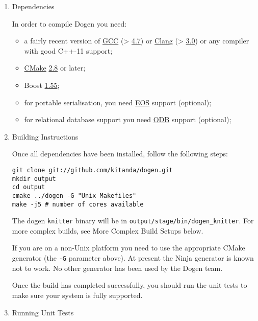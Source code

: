 \documentclass[11pt]{article}
\begin{document}
\begin{enumerate}
\item Dependencies
\label{sec-3-1-2-1}

In order to compile Dogen you need:

\begin{itemize}
\item a fairly recent version of \href{http://gcc.gnu.org/}{GCC} (> \href{http://gcc.gnu.org/gcc-4.7/}{4.7}) or \href{http://clang.llvm.org/index.html}{Clang} (> \href{http://llvm.org/releases/3.0/docs/ClangReleaseNotes.html}{3.0}) or any
compiler with good C++-11 support;
\item \href{http://www.cmake.org/}{CMake} \href{http://www.kitware.com/news/home/browse/CMake?2013_05_22&CMake\%2B2.8.11\%2BNow\%2BAvailable}{2.8} or later;
\item Boost \href{http://www.boost.org/users/history/version_1_55_0.html}{1.55};
\item for portable serialisation, you need \href{http://epa.codeplex.com/}{EOS} support (optional);
\item for relational database support you need \href{http://www.codesynthesis.com/products/odb/}{ODB} support (optional);
\end{itemize}

\item Building Instructions
\label{sec-3-1-2-2}

Once all dependencies have been installed, follow the following steps:

\begin{verbatim}
git clone git://github.com/kitanda/dogen.git
mkdir output
cd output
cmake ../dogen -G "Unix Makefiles"
make -j5 # number of cores available
\end{verbatim}

The dogen \texttt{knitter} binary will be in
\texttt{output/stage/bin/dogen\_knitter}. For more complex builds, see More
Complex Build Setups below.

If you are on a non-Unix platform you need to use the appropriate
CMake generator (the \texttt{-G} parameter above). At present the Ninja
generator is known not to work. No other generator has been used by
the Dogen team.

Once the build has completed successfully, you should run the unit
tests to make sure your system is fully supported.

\item Running Unit Tests
\label{sec-3-1-2-3}


\end{enumerate}
\end{document}
